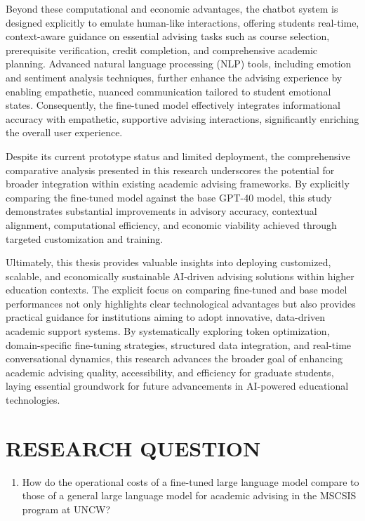 \documentclass[12pt,oneside,openany]{report}
\begin{document}
Beyond these computational and economic advantages, the chatbot system is designed explicitly to emulate human-like interactions, offering students real-time, context-aware guidance on essential advising tasks such as course selection, prerequisite verification, credit completion, and comprehensive academic planning. Advanced natural language processing (NLP) tools, including emotion and sentiment analysis techniques, further enhance the advising experience by enabling empathetic, nuanced communication tailored to student emotional states. Consequently, the fine-tuned model effectively integrates informational accuracy with empathetic, supportive advising interactions, significantly enriching the overall user experience.

Despite its current prototype status and limited deployment, the comprehensive comparative analysis presented in this research underscores the potential for broader integration within existing academic advising frameworks. By explicitly comparing the fine-tuned model against the base GPT-40 model, this study demonstrates substantial improvements in advisory accuracy, contextual alignment, computational efficiency, and economic viability achieved through targeted customization and training.

Ultimately, this thesis provides valuable insights into deploying customized, scalable, and economically sustainable AI-driven advising solutions within higher education contexts. The explicit focus on comparing fine-tuned and base model performances not only highlights clear technological advantages but also provides practical guidance for institutions aiming to adopt innovative, data-driven academic support systems. By systematically exploring token optimization, domain-specific fine-tuning strategies, structured data integration, and real-time conversational dynamics, this research advances the broader goal of enhancing academic advising quality, accessibility, and efficiency for graduate students, laying essential groundwork for future advancements in AI-powered educational technologies.


\chapter{RESEARCH QUESTION}

\begin{enumerate}
 \item How do the operational costs of a fine-tuned large language model compare to those of a general large language model for academic advising in the MSCSIS program at UNCW?
\end{enumerate}
\end{document}
